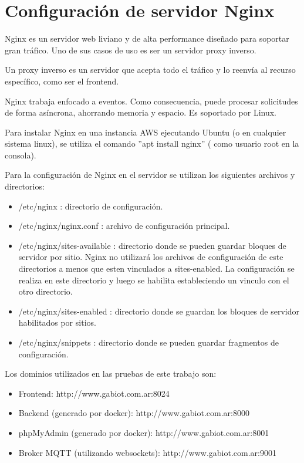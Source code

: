 
\chapter{Configuración de servidor Nginx} %

\label{AppendixB} %

Nginx \citep{WEBSITE:36} es un servidor web liviano y de alta performance diseñado para soportar gran tráfico. Uno de sus casos de uso es ser un servidor proxy inverso.

Un proxy inverso es un servidor que acepta todo el tráfico y lo reenvía al recurso específico, como ser el frontend.

Nginx trabaja enfocado a eventos. Como consecuencia, puede procesar solicitudes de forma asíncrona, ahorrando memoria y espacio. Es soportado por Linux.

Para instalar Nginx en una instancia AWS ejecutando Ubuntu (o en cualquier sistema linux), se utiliza el comando ''apt install nginx'' ( como usuario root en la consola).

Para la configuración de Nginx en el servidor se utilizan los siguientes archivos y directorios:
\begin{itemize}
\item /etc/nginx : directorio de configuración.
\item /etc/nginx/nginx.conf : archivo de configuración principal.
\item /etc/nginx/sites-available : directorio donde se pueden guardar bloques de servidor por sitio. Nginx no utilizará los archivos de configuración de este directorios a menos que esten vinculados a sites-enabled. La configuración se realiza en este directorio y luego se habilita estableciendo un vinculo con el otro directorio.
\item /etc/nginx/sites-enabled : directorio donde se guardan los bloques de servidor habilitados por sitios. 
\item /etc/nginx/snippets : directorio donde se pueden guardar fragmentos de configuración.
\end{itemize}

Los dominios utilizados en las pruebas de este trabajo son:

\begin{itemize}
\item Frontend: http://www.gabiot.com.ar:8024
\item Backend (generado por docker): http://www.gabiot.com.ar:8000
\item phpMyAdmin (generado por docker): http://www.gabiot.com.ar:8001
\item Broker MQTT (utilizando websockets): http://www.gabiot.com.ar:9001
\end{itemize}

